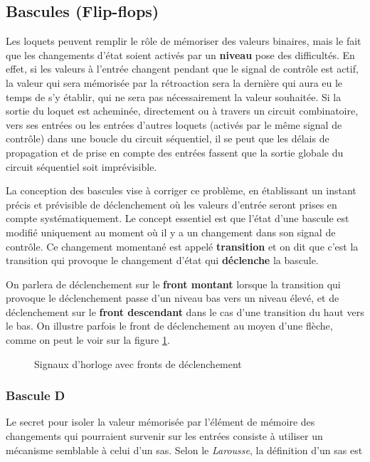 \documentclass[11pt]{article}
\begin{document}
\subsection{Bascules (Flip-flops)}
\label{sec:org92920e9}

Les loquets peuvent remplir le rôle de mémoriser des valeurs binaires,
mais le fait que les changements d'état soient activés par un \textbf{niveau}
pose des difficultés. En effet, si les valeurs à l'entrée changent
pendant que le signal de contrôle est actif, la valeur qui sera
mémorisée par la rétroaction sera la dernière qui aura eu le temps de
s'y établir, qui ne sera pas nécessairement la valeur souhaitée. Si la
sortie du loquet est acheminée, directement ou à travers un circuit
combinatoire, vers ses entrées ou les entrées d'autres loquets
(activés par le même signal de contrôle) dans une boucle du circuit
séquentiel, il se peut que les délais de propagation et de prise en
compte des entrées fassent que la sortie globale du circuit séquentiel
soit imprévisible.

La conception des bascules vise à corriger ce problème, en établissant
un instant précis et prévisible de déclenchement où les valeurs
d'entrée seront prises en compte systématiquement. Le concept
essentiel est que l'état d'une bascule est modifié uniquement au
moment où il y a un changement dans son signal de contrôle. Ce
changement momentané est appelé \textbf{transition} et on dit que c'est la
transition qui provoque le changement d'état qui \textbf{déclenche} la
bascule.

On parlera de déclenchement sur le \textbf{front montant} lorsque la
transition qui provoque le déclenchement passe d'un niveau bas vers un
niveau élevé, et de déclenchement sur le \textbf{front descendant} dans le
cas d'une transition du haut vers le bas.  On illustre parfois le
front de déclenchement au moyen d'une flèche, comme on peut le voir
sur la figure \ref{fig:org388b7e0}.

\begin{figure}[htbp]
\centering

\caption{\label{fig:org388b7e0}Signaux d'horloge avec fronts de déclenchement}
\end{figure}

\subsubsection{Bascule D}
\label{sec:orgc4ef31b}

Le secret pour isoler la valeur mémorisée par l'élément de mémoire des
changements qui pourraient survenir sur les entrées consiste à
utiliser un mécanisme semblable à celui d'un sas. Selon le \emph{Larousse}, la
définition d'un sas est
\end{document}
